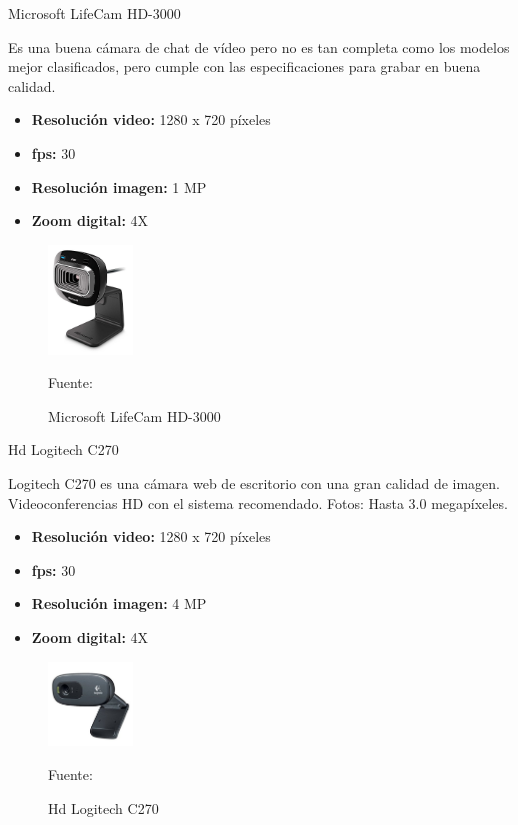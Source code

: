 \begin{enumerate}
{\bf\item[1. ] Microsoft LifeCam HD-3000} \vskip 0.1cm
Es una buena cámara de chat de vídeo pero no es tan completa como los modelos mejor clasificados, pero cumple con las especificaciones para grabar en buena calidad.
\begin{itemize}
\item[•] {\bf Resolución video:}
1280 x 720 píxeles
\item[•] {\bf fps:}
30
\item[•] {\bf Resolución imagen:}
1 MP
\item[•] {\bf Zoom digital:}
4X
\end{itemize}

\begin{figure}[ht]
\begin{center}
\includegraphics[width=0.2\textwidth]{Imagen9}
\end{center}
\begin{center}
\vskip -0.5cm
\caption{\small{Microsoft LifeCam HD-3000}}
{\small{Fuente: \cite{Amazon}}}
\end{center}
\end{figure}

{\bf\item[2. ] Hd Logitech C270} \vskip 0.1cm
Logitech C270 es una cámara web de escritorio con una gran calidad de imagen. Videoconferencias HD con el sistema recomendado. Fotos: Hasta 3.0 megapíxeles.
\begin{itemize}
\item[•] {\bf Resolución video:}
1280 x 720 píxeles
\item[•] {\bf fps:}
30
\item[•] {\bf Resolución imagen:}
4 MP
\item[•] {\bf Zoom digital:}
4X
\end{itemize}

\begin{figure}[ht]
\begin{center}
\includegraphics[width=0.2\textwidth]{Imagen10}
\end{center}
\begin{center}
\vskip -0.5cm
\caption{\small{Hd Logitech C270}}
{\small{Fuente: \cite{Amazon}}}
\end{center}
\end{figure}


\end{enumerate}
